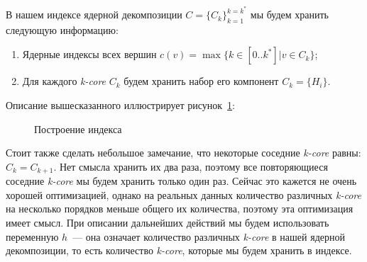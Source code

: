 В нашем индексе ядерной декомпозиции $C = \{C_k\}_{k = 1}^{k = k^*}$ мы будем хранить следующую информацию:

\begin{enumerate}
  \item Ядерные индексы всех вершин $c(v) = \max\{k \in [0..k^*] | v \in C_k \}$;
  \item Для каждого \textit{k-core} $C_k$ будем хранить набор его компонент $C_k = \{H_i\}$.
\end{enumerate}

Описание вышесказанного иллюстрирует рисунок~\ref{index-construct}:

\begin{figure}[!h]
\caption{Построение индекса}\label{index-construct}
\centering
  \begin{center}
  \end{center}
\end{figure}
\FloatBarrier

Стоит также сделать небольшое замечание, что некоторые соседние \textit{k-core} равны: $C_k = C_{k + 1}$. Нет смысла хранить их два раза, поэтому все повторяющиеся соседние \textit{k-core} мы будем хранить только один раз. Сейчас это кажется не очень хорошей оптимизацией, однако на реальных данных количество различных \textit{k-core} на несколько порядков меньше общего их количества, поэтому эта оптимизация имеет смысл. При описании дальнейших действий мы будем использовать переменную $h$~--- она означает количество различных \textit{k-core} в нашей ядерной декомпозиции, то есть количество \textit{k-core}, которые мы будем хранить в индексе.

